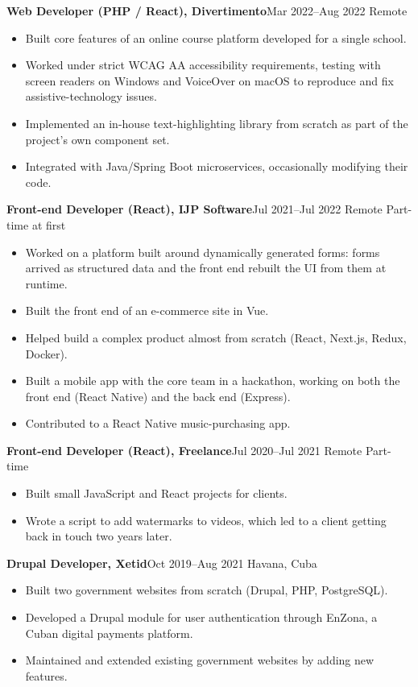 \documentclass[10pt,a4paper]{article}
\newcommand{\job}[3]{%
  \vspace{0.55em}
  {\bfseries #1}\hfill{\small\color{muted}#2}\par
  \ifx\relax#3\relax\else{\small\itshape\color{muted}#3}\par\fi
  \vspace{0.15em}
}
\newcommand{\subhead}[1]{\vspace{0.3em}{\small\bfseries\color{accent}#1}\par\vspace{0.1em}}
\begin{document}
\job{Web Developer (PHP / React), Divertimento}{Mar 2022--Aug 2022 \textbullet{} Remote}{}
\subhead{School e-learning platform}
\begin{itemize}
  \item Built core features of an online course platform developed for a single school.
  \item Worked under strict WCAG AA accessibility requirements, testing with screen readers on Windows and VoiceOver on macOS to reproduce and fix assistive-technology issues.
  \item Implemented an in-house text-highlighting library from scratch as part of the project's own component set.
  \item Integrated with Java/Spring Boot microservices, occasionally modifying their code.
\end{itemize}
\job{Front-end Developer (React), IJP Software}{Jul 2021--Jul 2022 \textbullet{} Remote \textbullet{} Part-time at first}{}
\begin{itemize}
  \item Worked on a platform built around dynamically generated forms: forms arrived as structured data and the front end rebuilt the UI from them at runtime.
  \item Built the front end of an e-commerce site in Vue.
  \item Helped build a complex product almost from scratch (React, Next.js, Redux, Docker).
  \item Built a mobile app with the core team in a hackathon, working on both the front end (React Native) and the back end (Express).
  \item Contributed to a React Native music-purchasing app.
\end{itemize}
\job{Front-end Developer (React), Freelance}{Jul 2020--Jul 2021 \textbullet{} Remote \textbullet{} Part-time}{}
\begin{itemize}
  \item Built small JavaScript and React projects for clients.
  \item Wrote a script to add watermarks to videos, which led to a client getting back in touch two years later.
\end{itemize}
\job{Drupal Developer, Xetid}{Oct 2019--Aug 2021 \textbullet{} Havana, Cuba}{}
\begin{itemize}
  \item Built two government websites from scratch (Drupal, PHP, PostgreSQL).
  \item Developed a Drupal module for user authentication through EnZona, a Cuban digital payments platform.
  \item Maintained and extended existing government websites by adding new features.
\end{itemize}
\end{document}
